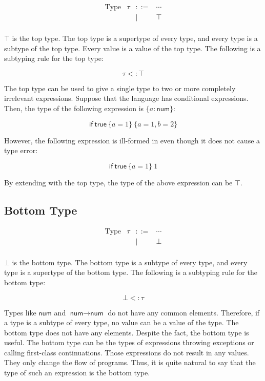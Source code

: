 \[
\begin{array}{rrcl}
\text{Type} & \tau & ::= & \cdots \\
&&|& \top \\
\end{array}
\]

$\top$ is the top type. The top type is a supertype of every type, and every
type is a subtype of the top type. Every value is a value of the top type. The
following is a subtyping rule for the top type:

\[\tau<:\top\]

The top type can be used to give a single type to two or more completely
irrelevant expressions. Suppose that the language has conditional expressions.
Then, the type of the following expression is $\{a:\textsf{num}\}$:

\[\textsf{if}\ \textsf{true}\ \{a=1\}\ \{a=1,b=2\}\]

However, the following expression is ill-formed in \lang even though it does not
cause a type error:

\[\textsf{if}\ \textsf{true}\ \{a=1\}\ 1\]

By extending \lang with the top type, the type of the above expression can be
$\top$.

\subsection{Bottom Type}

\[
\begin{array}{rrcl}
\text{Type} & \tau & ::= & \cdots \\
&&|& \bot \\
\end{array}
\]

$\bot$ is the bottom type. The bottom type is a subtype of every type, and
every type is a supertype of the bottom type. The following is a subtyping rule
for the bottom type:

\[\bot<:\tau\]

Types like $\textsf{num}$ and $\textsf{num}\rightarrow\textsf{num}$ do not have any
common elements. Therefore, if a type is a subtype of every type, no value can
be a value of the type. The bottom type does not have any elements. Despite
the fact, the bottom type is useful. The bottom type can be the types of
expressions throwing exceptions or calling first-class continuations. Those
expressions do not result in any values. They only change the flow of
programs. Thus, it is quite natural to say that the type of such an expression
is the bottom type.

